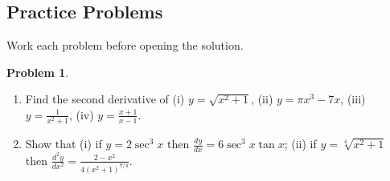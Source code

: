 \documentclass[11pt,a4paper]{article}
\theoremstyle{definition}
\newtheorem{problemx}{Problem}[section]
\newenvironment{problem}{\begin{problemx}}{\end{problemx}}
\begin{document}
\subsection{Practice Problems}

Work each problem before opening the solution.

\begin{problem}
\begin{enumerate}
\item[(a).] Find the second derivative of
\quad (i) $y=\sqrt{x^2+1}$, \quad (ii) $y=\pi x^3-7x$, \quad
(iii) $y=\frac{1}{x^2+1}$, \quad (iv) $y=\frac{x+1}{x-1}$.
\item[(b).] Show that \quad (i) if $y=2\sec^3x$ then $\frac{dy}{dx}=6\sec^3x\tan x$;
\quad (ii) if $y=\sqrt[4]{x^2+1}$ then
$\frac{d^2y}{dx^2}=\frac{2-x^2}{4\left(x^2+1\right)^{7/4}}$.
\end{enumerate}
\end{problem}
\end{document}
